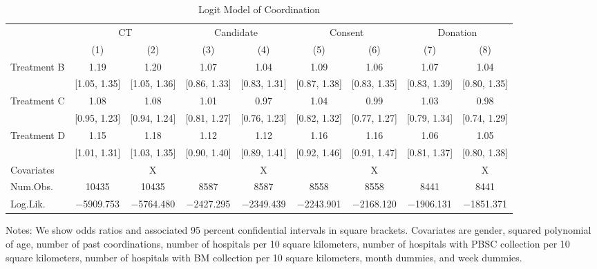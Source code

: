 \documentclass[
  lualatex,
  11pt,
  a4paper
]{article}
\begin{document}
\begin{table}[H]

\caption{\label{tab:logit-coordination}Logit Model of Coordination}
\centering
\fontsize{9}{11}\selectfont
\begin{threeparttable}
\begin{tabular}[t]{lcccccccc}
\toprule
\multicolumn{1}{c}{ } & \multicolumn{2}{c}{CT} & \multicolumn{2}{c}{Candidate} & \multicolumn{2}{c}{Consent} & \multicolumn{2}{c}{Donation} \\
\cmidrule(l{3pt}r{3pt}){2-3} \cmidrule(l{3pt}r{3pt}){4-5} \cmidrule(l{3pt}r{3pt}){6-7} \cmidrule(l{3pt}r{3pt}){8-9}
  & (1) & (2) & (3) & (4) & (5) & (6) & (7) & (8)\\
\midrule
Treatment B & \num{1.19} & \num{1.20} & \num{1.07} & \num{1.04} & \num{1.09} & \num{1.06} & \num{1.07} & \num{1.04}\\
 & {}[\num{1.05}, \num{1.35}] & {}[\num{1.05}, \num{1.36}] & {}[\num{0.86}, \num{1.33}] & {}[\num{0.83}, \num{1.31}] & {}[\num{0.87}, \num{1.38}] & {}[\num{0.83}, \num{1.35}] & {}[\num{0.83}, \num{1.39}] & {}[\num{0.80}, \num{1.35}]\\
Treatment C & \num{1.08} & \num{1.08} & \num{1.01} & \num{0.97} & \num{1.04} & \num{0.99} & \num{1.03} & \num{0.98}\\
 & {}[\num{0.95}, \num{1.23}] & {}[\num{0.94}, \num{1.24}] & {}[\num{0.81}, \num{1.27}] & {}[\num{0.76}, \num{1.23}] & {}[\num{0.82}, \num{1.32}] & {}[\num{0.77}, \num{1.27}] & {}[\num{0.79}, \num{1.34}] & {}[\num{0.74}, \num{1.29}]\\
Treatment D & \num{1.15} & \num{1.18} & \num{1.12} & \num{1.12} & \num{1.16} & \num{1.16} & \num{1.06} & \num{1.05}\\
 & {}[\num{1.01}, \num{1.31}] & {}[\num{1.03}, \num{1.35}] & {}[\num{0.90}, \num{1.40}] & {}[\num{0.89}, \num{1.41}] & {}[\num{0.92}, \num{1.46}] & {}[\num{0.91}, \num{1.47}] & {}[\num{0.81}, \num{1.37}] & {}[\num{0.80}, \num{1.38}]\\
\midrule
Covariates &  & X &  & X &  & X &  & X\\
Num.Obs. & \num{10435} & \num{10435} & \num{8587} & \num{8587} & \num{8558} & \num{8558} & \num{8441} & \num{8441}\\
Log.Lik. & \num{-5909.753} & \num{-5764.480} & \num{-2427.295} & \num{-2349.439} & \num{-2243.901} & \num{-2168.120} & \num{-1906.131} & \num{-1851.371}\\
\bottomrule
\end{tabular}
\begin{tablenotes}
\item Notes: We show odds ratios and associated 95 percent confidential intervals in square brackets. Covariates are gender, squared polynomial of age, number of past coordinations, number of hospitals per 10 square kilometers, number of hospitals with PBSC collection per 10 square kilometers, number of hospitals with BM collection per 10 square kilometers, month dummies, and week dummies.
\end{tablenotes}
\end{threeparttable}
\end{table}
\end{document}
